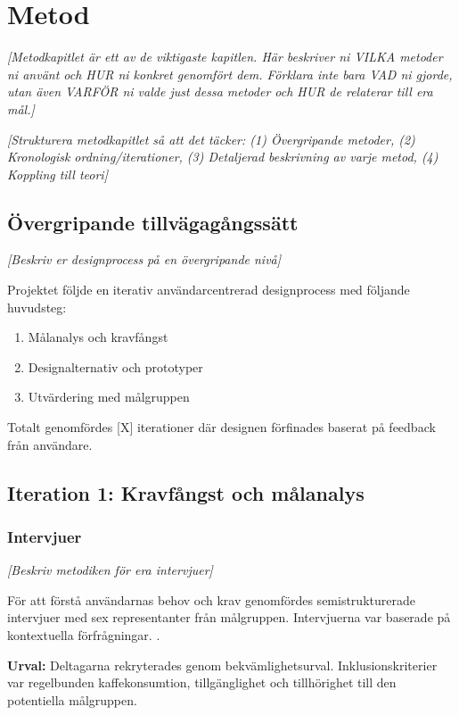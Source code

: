 \section{Metod}

\textit{[Metodkapitlet är ett av de viktigaste kapitlen. Här beskriver ni VILKA metoder ni använt och HUR ni konkret genomfört dem. Förklara inte bara VAD ni gjorde, utan även VARFÖR ni valde just dessa metoder och HUR de relaterar till era mål.]}

\textit{[Strukturera metodkapitlet så att det täcker: (1) Övergripande metoder, (2) Kronologisk ordning/iterationer, (3) Detaljerad beskrivning av varje metod, (4) Koppling till teori]}


\subsection{Övergripande tillvägagångssätt}

\textit{[Beskriv er designprocess på en övergripande nivå]}

Projektet följde en iterativ användarcentrerad designprocess med följande huvudsteg:
\begin{enumerate}
    \item Målanalys och kravfångst
    \item Designalternativ och prototyper
    \item Utvärdering med målgruppen
\end{enumerate}

Totalt genomfördes [X] iterationer där designen förfinades baserat på feedback från användare.


\subsection{Iteration 1: Kravfångst och målanalys}

\subsubsection{Intervjuer}

\textit{[Beskriv metodiken för era intervjuer]}

För att förstå användarnas behov och krav genomfördes semistrukturerade intervjuer med sex representanter från målgruppen. Intervjuerna var baserade på kontextuella förfrågningar. \cite{sharp2019}.

\textbf{Urval:} Deltagarna rekryterades genom bekvämlighetsurval. Inklusionskriterier var regelbunden kaffekonsumtion, tillgänglighet och tillhörighet till den potentiella målgruppen. 

